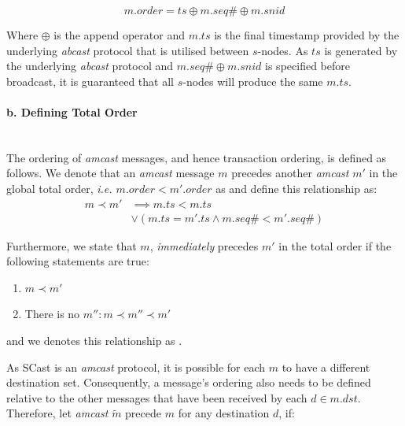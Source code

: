\begin{enumerate}
        \begin{equation*}
            m.order = ts\oplus m.seq\# \oplus m.snid
        \end{equation*}        		
		
        Where $\oplus$ is the append operator and $m.ts$ is the final timestamp provided by the underlying \emph{abcast} protocol that is utilised between $s$-nodes.  As $ts$ is generated by the underlying \emph{abcast} protocol and $m.seq\# \oplus m.snid$ is specified before broadcast, it is guaranteed that all $s$-nodes will produce the same $m.ts$.  
        
        \paragraph{b. Defining Total Order} \hfill \\
        The ordering of \emph{amcast} messages, and hence transaction ordering, is defined as follows.  We denote that an \emph{amcast} message $m$ precedes another \emph{amcast} $m'$ in the global total order, \emph{i.e. $m.order < m'.order$} as   and define this relationship as:
        \begin{equation*}
            \begin{split}
                   m \prec m' &\implies  m.ts < m.ts \\
                   & \lor \left(m.ts = m'.ts  \land m.seq\# < m'.seq\#\right)
            \end{split}
        \end{equation*}
        
        Furthermore, we state that $m$, \emph{immediately} precedes $m'$ in the total order if the following statements are true:
        
        \begin{enumerate}[label={(\roman*)}, leftmargin=5em]
            \item    $m \prec m'$
            \item    There is no $m'' : m \prec m'' \prec m'$
        \end{enumerate}

        and we denotes this relationship as .  
        
        As \textsf{SCast} is an \emph{amcast} protocol, it is possible for each $m$ to have a different destination set.  Consequently, a message's ordering also needs to be defined relative to the other messages that have been received by each $d \in m.dst$.  Therefore, let \emph{amcast} $\tilde{m}$ precede $m$ for any destination $d$, if:
        

\end{enumerate}
